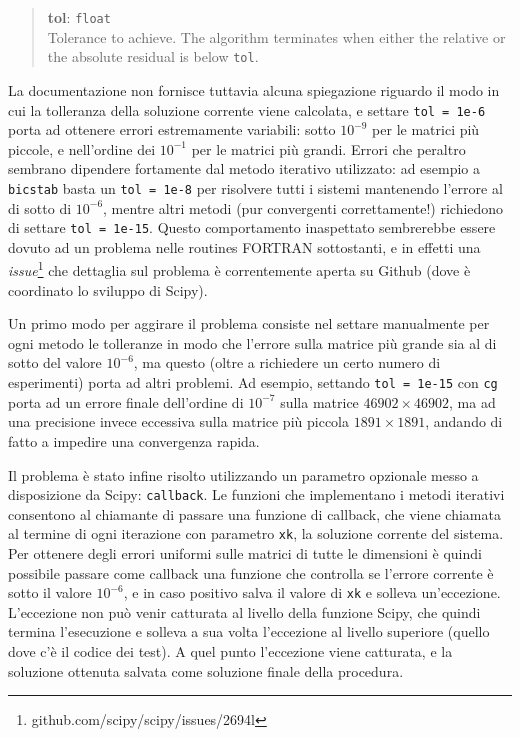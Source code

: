\documentclass[11pt,a4paper]{scrartcl}
\begin{document}
\begin{quote}
\textbf{tol}: \texttt{float} \\
Tolerance to achieve. The algorithm terminates when either the relative or the absolute residual is below \texttt{tol}.
\end{quote}

La documentazione non fornisce tuttavia alcuna spiegazione riguardo il modo in cui la tolleranza della soluzione corrente viene calcolata, e settare \texttt{tol = 1e-6} porta ad ottenere errori estremamente variabili: sotto $10^{-9}$ per le matrici più piccole, e nell'ordine dei $10^{-1}$ per le matrici più grandi. Errori che peraltro sembrano dipendere fortamente dal metodo iterativo utilizzato: ad esempio a \texttt{bicstab} basta un \texttt{tol = 1e-8} per risolvere tutti i sistemi mantenendo l'errore al di sotto di $10^{-6}$, mentre altri metodi (pur convergenti correttamente!) richiedono di settare \texttt{tol = 1e-15}. Questo comportamento inaspettato sembrerebbe essere dovuto ad un problema nelle routines FORTRAN sottostanti, e in effetti una \emph{issue}\footnote{github.com/scipy/scipy/issues/2694l} che dettaglia sul problema è correntemente aperta su Github (dove è coordinato lo sviluppo di Scipy).

Un primo modo per aggirare il problema consiste nel settare manualmente per ogni metodo le tolleranze in modo che l'errore sulla matrice più grande sia al di sotto del valore $10^{-6}$, ma questo (oltre a richiedere un certo numero di esperimenti) porta ad altri problemi. Ad esempio, settando \texttt{tol = 1e-15} con \texttt{cg} porta ad un errore finale dell'ordine di $10^{-7}$ sulla matrice $46902 \times 46902$, ma ad una precisione invece eccessiva sulla matrice più piccola $1891 \times 1891$, andando di fatto a impedire una convergenza rapida.

Il problema è stato infine risolto utilizzando un parametro opzionale messo a disposizione da Scipy: \texttt{callback}. Le funzioni che implementano i metodi iterativi consentono al chiamante di passare una funzione di callback, che viene chiamata al termine di ogni iterazione con parametro \texttt{xk}, la soluzione corrente del sistema. Per ottenere degli errori uniformi sulle matrici di tutte le dimensioni è quindi possibile passare come callback una funzione che controlla se l'errore corrente è sotto il valore $10^{-6}$, e in caso positivo salva il valore di \texttt{xk} e solleva un'eccezione. L'eccezione non può venir catturata al livello della funzione Scipy, che quindi termina l'esecuzione e solleva a sua volta l'eccezione al livello superiore (quello dove c'è il codice dei test). A quel punto l'eccezione viene catturata, e la soluzione ottenuta salvata come soluzione finale della procedura.
\end{document}
